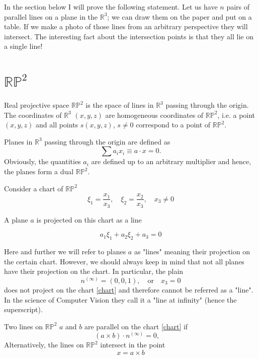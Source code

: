 \documentclass[a4paper,10pt]{article}
\begin{document}
In the section below I will prove the following statement. Let us have $n$ pairs of parallel lines on a plane in the $\mathbb{R}^3$; we can draw them on the paper and put on a table. If we make a photo of those lines from an arbitrary perspective they will intersect. The interesting fact about  the intersection points is that they all lie on a single line!

\section{$\mathbb{RP}^2$ }
 Real projective space $\mathbb{RP}^2$ is the space of lines in $\mathbb{R}^{3}$ passing through the origin. The coordinates of $\mathbb{R}^3$ $(x,y,z)$ are homogeneous coordinates of $\mathbb{RP}^2$, i.e. a point $(x,y,z)$ and all points $s(x,y,z)$, $s\neq 0$ correspond to a point of $\mathbb{RP}^2$.  

Planes in $\mathbb{R}^3$ passing through the origin are defined as 
\begin{equation}
\sum a_i x_i \equiv a\cdot x= 0.
\end{equation}
 Obviously, the quantities $a_i$ are defined up to an arbitrary multiplier and hence, the planes form a dual $\mathbb{RP}^2$. 
 
 Consider a chart of $\mathbb{RP}^2$
 \begin{equation}
 \xi_1 = \frac{x_1}{x_3}, \quad \xi_2=\frac{x_2}{x_3}, \quad x_3\neq 0\label{chart}
 \end{equation}
 
A plane $a$ is projected on this chart as a line

\begin{equation}
a_1 \xi_1 + a_2 \xi_2 + a_3 = 0
\end{equation} 

Here and further we will refer to planes $a$ as "lines" meaning their projection on the certain chart. However, we should always keep in mind that not all planes have their projection on the chart. In particular, the plain 
\begin{equation}
n^{(\infty)} = (0,0,1), \quad \text{or} \quad x_3 = 0\label{z0}
\end{equation}
does not project on the chart \eqref{chart} and therefore cannot be referred as a "line". In the science of Computer Vision they call it a "line at infinity" (hence the superscript).

Two lines on $\mathbb{RP}^2$ $a$ and $b$ are parallel on the chart  \eqref{chart} if 
\begin{equation}
(a\times b )\cdot n^{(\infty)} = 0, \quad \label{parallel}
\end{equation}
Alternatively, the lines on $\mathbb{RP}^2$ intersect in the point 
\begin{equation}
x = a \times b\label{intersectionpoint}
\end{equation}
\end{document}
